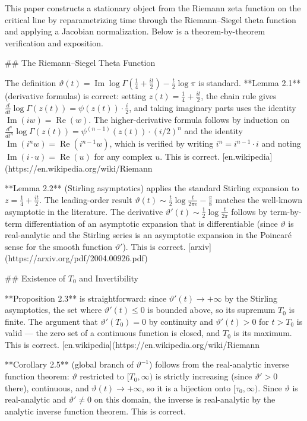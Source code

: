 This paper constructs a stationary object from the Riemann zeta function on the critical line by reparametrizing time through the Riemann–Siegel theta function and applying a Jacobian normalization. Below is a theorem-by-theorem verification and exposition.

## The Riemann–Siegel Theta Function

The definition \(\vartheta(t) = \operatorname{Im}\log\Gamma(\tfrac{1}{4}+\tfrac{it}{2}) - \tfrac{t}{2}\log\pi\) is standard. **Lemma 2.1** (derivative formulas) is correct: setting \(z(t) = \tfrac{1}{4}+\tfrac{it}{2}\), the chain rule gives \(\frac{d}{dt}\log\Gamma(z(t)) = \psi(z(t))\cdot\frac{i}{2}\), and taking imaginary parts uses the identity \(\operatorname{Im}(iw) = \operatorname{Re}(w)\). The higher-derivative formula follows by induction on \(\frac{d^n}{dt^n}\log\Gamma(z(t)) = \psi^{(n-1)}(z(t))\cdot(i/2)^n\) and the identity \(\operatorname{Im}(i^n w) = \operatorname{Re}(i^{n-1}w)\), which is verified by writing \(i^n = i^{n-1}\cdot i\) and noting \(\operatorname{Im}(i\cdot u) = \operatorname{Re}(u)\) for any complex \(u\). This is correct. [en.wikipedia](https://en.wikipedia.org/wiki/Riemann%

**Lemma 2.2** (Stirling asymptotics) applies the standard Stirling expansion to \(z = \tfrac{1}{4}+\tfrac{it}{2}\). The leading-order result \(\vartheta(t) \sim \tfrac{t}{2}\log\tfrac{t}{2\pi e} - \tfrac{\pi}{8}\) matches the well-known asymptotic in the literature. The derivative \(\vartheta'(t) \sim \tfrac{1}{2}\log\tfrac{t}{2\pi}\) follows by term-by-term differentiation of an asymptotic expansion that is differentiable (since \(\vartheta\) is real-analytic and the Stirling series is an asymptotic expansion in the Poincaré sense for the smooth function \(\vartheta'\)). This is correct. [arxiv](https://arxiv.org/pdf/2004.00926.pdf)

## Existence of \(T_0\) and Invertibility

**Proposition 2.3** is straightforward: since \(\vartheta'(t) \to +\infty\) by the Stirling asymptotics, the set where \(\vartheta'(t) \le 0\) is bounded above, so its supremum \(T_0\) is finite. The argument that \(\vartheta'(T_0) = 0\) by continuity and \(\vartheta'(t) > 0\) for \(t > T_0\) is valid — the zero set of a continuous function is closed, and \(T_0\) is its maximum. This is correct. [en.wikipedia](https://en.wikipedia.org/wiki/Riemann%

**Corollary 2.5** (global branch of \(\vartheta^{-1}\)) follows from the real-analytic inverse function theorem: \(\vartheta\) restricted to \([T_0, \infty)\) is strictly increasing (since \(\vartheta' > 0\) there), continuous, and \(\vartheta(t) \to +\infty\), so it is a bijection onto \([\tau_0, \infty)\). Since \(\vartheta\) is real-analytic and \(\vartheta' \neq 0\) on this domain, the inverse is real-analytic by the analytic inverse function theorem. This is correct.

